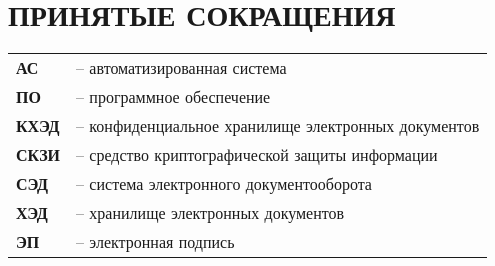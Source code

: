 \chapter*{ПРИНЯТЫЕ СОКРАЩЕНИЯ}
\begin{tabular}{ll}

\textbf{АС} & -- автоматизированная система \\
\textbf{ПО} & -- программное обеспечение \\
\textbf{КХЭД} & -- конфиденциальное хранилище электронных документов \\
\textbf{СКЗИ} & -- средство криптографической защиты информации \\
\textbf{СЭД} & -- система электронного документооборота \\
\textbf{ХЭД} & -- хранилище электронных документов \\
\textbf{ЭП} & -- электронная подпись \\
\end{tabular}
\clearpage